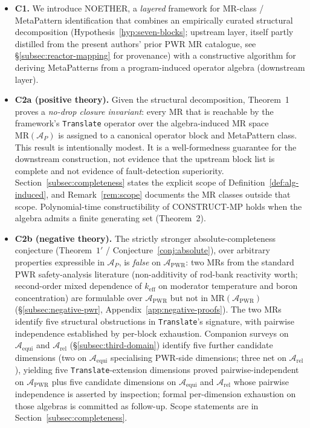 \documentclass[manuscript]{acmart}
\begin{document}
\begin{itemize}
  \item \textbf{C1.} We introduce NOETHER, a \emph{layered} framework for MR-class / MetaPattern identification that combines an empirically curated structural decomposition (Hypothesis~\ref{hyp:seven-blocks}; upstream layer, itself partly distilled from the present authors' prior PWR MR catalogue, see \S\ref{subsec:reactor-mapping} for provenance) with a constructive algorithm for deriving MetaPatterns from a program-induced operator algebra (downstream layer).
  \item \textbf{C2a (positive theory).} Given the structural decomposition, Theorem~1 proves a \emph{no-drop closure invariant}: every MR that is reachable by the framework's \texttt{Translate} operator over the algebra-induced MR space $\mathrm{MR}(\mathcal{A}_{P})$ is assigned to a canonical operator block and MetaPattern class. This result is intentionally modest. It is a well-formedness guarantee for the downstream construction, not evidence that the upstream block list is complete and not evidence of fault-detection superiority. Section~\ref{subsec:completeness} states the explicit scope of Definition~\ref{def:alg-induced}, and Remark~\ref{rem:scope} documents the MR classes outside that scope. Polynomial-time constructibility of CONSTRUCT-MP holds when the algebra admits a finite generating set (Theorem~2).
  \item \textbf{C2b (negative theory).} The strictly stronger absolute-completeness conjecture (Theorem~$1'$ / Conjecture~\ref{conj:absolute}), over arbitrary properties expressible in $\mathcal{A}_P$, is \emph{false} on $\mathcal{A}_{\mathrm{PWR}}$: two MRs from the standard PWR safety-analysis literature (non-additivity of rod-bank reactivity worth; second-order mixed dependence of $k_{\mathrm{eff}}$ on moderator temperature and boron concentration) are formulable over $\mathcal{A}_{\mathrm{PWR}}$ but not in $\mathrm{MR}(\mathcal{A}_{\mathrm{PWR}})$ (\S\ref{subsec:negative-pwr}, Appendix~\ref{app:negative-proofs}). The two MRs identify five structural obstructions in \texttt{Translate}'s signature, with pairwise independence established by per-block exhaustion. Companion surveys on $\mathcal{A}_{\mathrm{equi}}$ and $\mathcal{A}_{\mathrm{rel}}$ (\S\ref{subsec:third-domain}) identify five further candidate dimensions (two on $\mathcal{A}_{\mathrm{equi}}$ specialising PWR-side dimensions; three net on $\mathcal{A}_{\mathrm{rel}}$), yielding five \texttt{Translate}-extension dimensions proved pairwise-independent on $\mathcal{A}_{\mathrm{PWR}}$ plus five candidate dimensions on $\mathcal{A}_{\mathrm{equi}}$ and $\mathcal{A}_{\mathrm{rel}}$ whose pairwise independence is asserted by inspection; formal per-dimension exhaustion on those algebras is committed as follow-up. Scope statements are in Section~\ref{subsec:completeness}.

\end{itemize}
\end{document}
